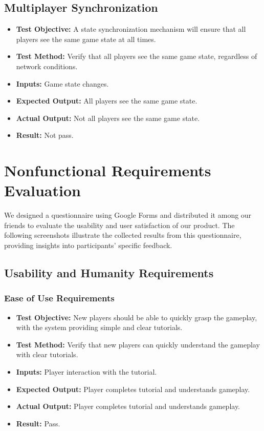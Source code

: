 \documentclass[12pt, titlepage]{article}
\begin{document}
\subsection{Multiplayer Synchronization}
\begin{itemize}
    \item \textbf{Test Objective:} A state synchronization mechanism will ensure that all players see the same game state at all times.
    \item \textbf{Test Method:} Verify that all players see the same game state, regardless of network conditions.
    \item \textbf{Inputs:} Game state changes.
    \item \textbf{Expected Output:} All players see the same game state.
    \item \textbf{Actual Output:} Not all players see the same game state.

        \item \textbf{Result:} Not pass.
\end{itemize}

\newpage

\section{Nonfunctional Requirements Evaluation}

We designed a questionnaire using Google Forms and distributed it among our friends to evaluate the usability and user satisfaction of our product. The following screenshots illustrate the collected results from this questionnaire, providing insights into participants' specific feedback.

\subsection{Usability and Humanity Requirements}

\subsubsection{Ease of Use Requirements}

\begin{itemize}
    \item \textbf{Test Objective:} New players should be able to quickly grasp the gameplay, with the system providing simple and clear tutorials.
    \item \textbf{Test Method:} Verify that new players can quickly understand the gameplay with clear tutorials.

        \item \textbf{Inputs:} Player interaction with the tutorial.
    \item \textbf{Expected Output:} Player completes tutorial and understands gameplay.
    \item \textbf{Actual Output:} Player completes tutorial and understands gameplay.
    \item \textbf{Result:} Pass.
\end{itemize}
\end{document}
